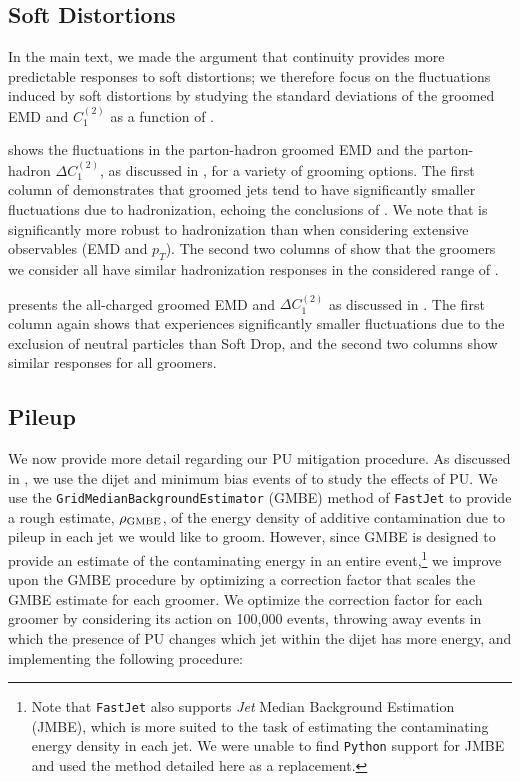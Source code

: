 \subsection{Soft Distortions}
In the main text, we made the argument that continuity provides more predictable responses to soft distortions;
%
we therefore focus on the fluctuations induced by soft distortions by studying the standard deviations of the groomed EMD and \(C_1^{(2)}\) as a function of \zcut.

 shows the fluctuations in the parton-hadron groomed EMD and the parton-hadron \(\Delta C_1^{(2)}\), as discussed in , for a variety of grooming options.
%
The first column of  demonstrates that  groomed jets tend to have significantly smaller fluctuations due to hadronization, echoing the conclusions of .
%
We note that  is significantly more robust to hadronization than  when considering extensive observables (EMD and \(p_T\)).
%
The second two columns of  show that the \PIRANHA{} groomers we consider all have similar hadronization responses in the considered range of \zcut.

 presents the all-charged groomed EMD and \(\Delta C_1^{(2)}\) as discussed in .
%
The first column again shows that  experiences significantly smaller fluctuations due to the exclusion of neutral particles than Soft Drop, and the second two columns show similar responses for all \PIRANHA{} groomers.


\subsection{Pileup}
\label{app:pufrenzy}

We now provide more detail regarding our PU mitigation procedure.
%
As discussed in , we use the dijet and minimum bias events of  to study the effects of PU.
%
We use the \texttt{GridMedianBackgroundEstimator} (GMBE) method of \texttt{FastJet} \cite{Cacciari:2011ma} to provide a rough estimate, \(\rho_{\rm GMBE}\), of the energy density of additive contamination due to pileup in each jet we would like to groom.
%
However, since GMBE is designed to provide an estimate of the contaminating energy in an entire event,\footnote{
Note that \texttt{FastJet} also supports \textit{Jet} Median Background Estimation (JMBE), which is more suited to the task of estimating the contaminating energy density in each jet.
%
We were unable to find \texttt{Python} support for JMBE and used the method detailed here as a replacement.
} we improve upon the GMBE procedure by optimizing a correction factor that scales the GMBE estimate for each groomer.
%
We optimize the correction factor for each groomer by considering its action on 100,000 events, throwing away events in which the presence of PU changes which jet within the dijet has more energy, and implementing the following procedure:

